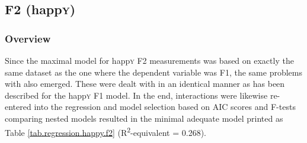 \subsection{F2 (happ\textrm{\textsc{y}})}
\label{sec.prod.res.vow.happy.f2}

\subsubsection{Overview}
\label{sec.prod.res.vow.happy.f2.overview}

Since the maximal model for happ\textsc{y} F2 measurements was based on exactly the same dataset as the one where the dependent variable was F1, the same problems with  also emerged.
These were dealt with in an identical manner as has been described for the happ\textsc{y} F1 model.
In the end, interactions were likewise re-entered into the regression and model selection based on AIC scores and F-tests comparing nested models resulted in the minimal adequate model printed as Table \ref{tab.regression.happy.f2} (R\textsuperscript{2}-equivalent = 0.268).

